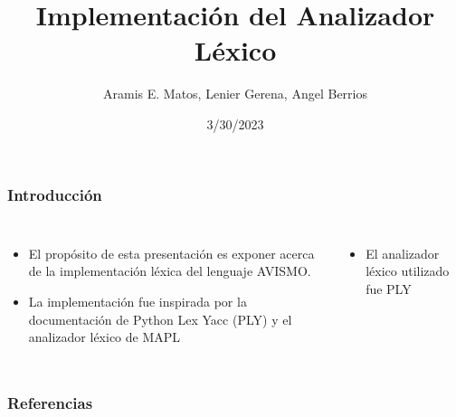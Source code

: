 \documentclass[14pt, aspectratio=169]{beamer}
\title{Implementación del Analizador Léxico}
\author{Aramis E. Matos, Lenier Gerena, Angel Berrios}
\date{3/30/2023}
\begin{document}
\maketitle

\begin{frame}
    \frametitle{Introducción}
    \begin{columns}
        \small
        \begin{itemize}
            \item El propósito de esta presentación es exponer acerca de la implementación léxica del lenguaje AVISMO.
            \item La implementación fue inspirada por la documentación de Python Lex Yacc (PLY)  \cite{noauthor_ply_nodate} y el analizador léxico de MAPL \cite{noauthor_pl-project-lgm-yvv-amnmapl_nodate}
        \end{itemize}
        \begin{itemize}
            \item El analizador léxico utilizado fue PLY
        \end{itemize}
    \end{columns}
\end{frame}


\begin{frame}
    \frametitle{Referencias}
    
    
\end{frame}
\end{document}
